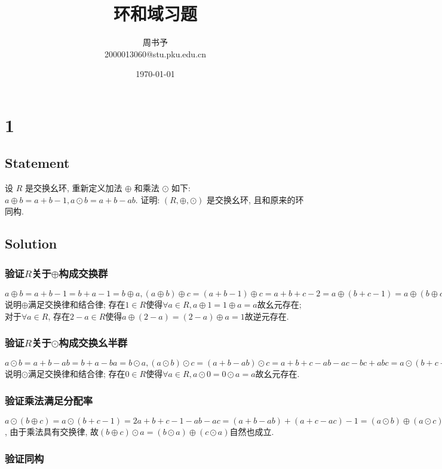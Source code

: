 \documentclass[UTF-8]{ctexart}
\title{\heiti\zihao{1} 环和域习题}
\author{\kaishu\zihao{-3} 周书予\\2000013060@stu.pku.edu.cn}
\date{\today}
\begin{document}
\maketitle

\section*{1}
\subsection*{Statement}
设 $R$ 是交换幺环, 重新定义加法 $\oplus$ 和乘法 $\odot$ 如下: $a \oplus b = a + b - 1, a \odot b = a + b - ab$. 证明: $(R, \oplus, \odot)$ 是交换幺环, 且和原来的环同构.
\subsection*{Solution}
\subsubsection*{验证$R$关于$\oplus$构成交换群}$a \oplus b = a + b - 1 = b + a - 1 = b \oplus a, (a \oplus b) \oplus c = (a + b - 1) \oplus c = a + b + c - 2 = a \oplus (b + c - 1) = a \oplus (b \oplus c)$说明$\oplus$满足交换律和结合律; 存在$1 \in R$使得$\forall a \in R, a \oplus 1 = 1 \oplus a = a$故幺元存在; 对于$\forall a \in R$, 存在$2 - a \in R$使得$a \oplus (2 - a) = (2 - a) \oplus a = 1$故逆元存在.

\subsubsection*{验证$R$关于$\odot$构成交换幺半群}$a \odot b = a + b - ab = b + a - ba = b \odot a, (a \odot b) \odot c = (a + b - ab) \odot c = a + b + c - ab - ac - bc + abc = a \odot (b + c - bc) = a \odot (b \odot c)$说明$\odot$满足交换律和结合律; 存在$0 \in R$使得$\forall a \in R, a \odot 0 = 0 \odot a = a$故幺元存在.

\subsubsection*{验证乘法满足分配率}$a \odot (b \oplus c) = a \odot (b + c - 1) = 2a + b + c - 1 - ab - ac = (a + b - ab) + (a + c - ac) - 1 = (a \odot b) \oplus (a \odot c)$, 由于乘法具有交换律, 故$(b \oplus c) \odot a = (b \odot a) \oplus (c \odot a)$自然也成立.

\subsubsection*{验证同构}
\end{document}
